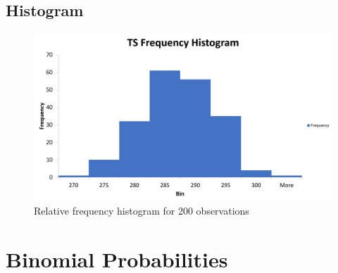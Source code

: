 \documentclass[letterpaper]{article}
\begin{document}
\subsection{Histogram}
\begin{figure}[H]
 \centering
 \includegraphics[width=\textwidth]{histogram.png}
 \caption{Relative frequency histogram for 200 observations}
 \label{histogram}
\end{figure}

\subsection{} %

\subsection{} %

\section{Binomial Probabilities}

\subsection{} %

\subsection{} %
\end{document}

